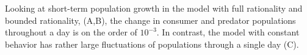 Looking at short-term population growth in the model with full rationality and bounded rationality, (A,B), the change in consumer and predator populations throughout a day is on the order of $10^{-3}$. In contrast, the model with constant behavior has rather large fluctuations of populations through a single day (C).




